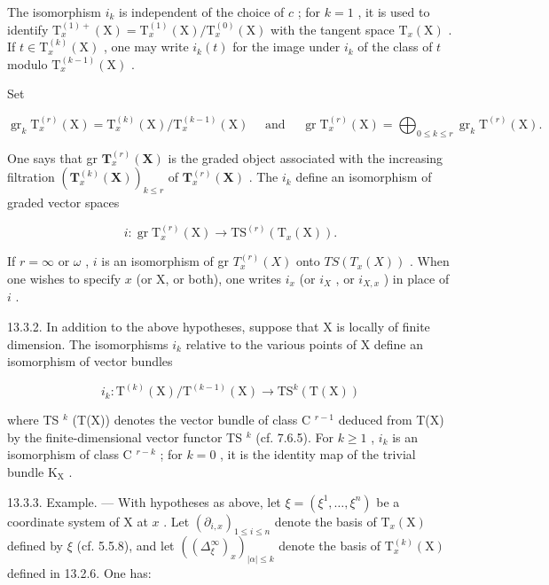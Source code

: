 The isomorphism \(i_k\) is independent of the choice of \(c\) ; for \(k = 1\) , it is used to identify \(\mathrm{T}_x^{(1)+}(\mathrm{X}) = \mathrm{T}_x^{(1)}(\mathrm{X}) / \mathrm{T}_x^{(0)}(\mathrm{X})\) with the tangent space \(\mathrm{T}_x(\mathrm{X})\) . If \(t \in \mathrm{T}_x^{(k)}(\mathrm{X})\) , one may write \(i_k(t)\) for the image under \(i_k\) of the class of \(t\) modulo \(\mathrm{T}_x^{(k-1)}(\mathrm{X})\) .

Set

\[
\operatorname{gr} _ {k} \mathrm{T} _ {x} ^ {(r)} (\mathrm{X}) = \mathrm{T} _ {x} ^ {(k)} (\mathrm{X}) / \mathrm{T} _ {x} ^ {(k - 1)} (\mathrm{X}) \quad \text { and } \quad \operatorname{gr} \mathrm{T} _ {x} ^ {(r)} (\mathrm{X}) = \bigoplus_ {0 \leqslant k \leqslant r} \operatorname{gr} _ {k} \mathrm{T} ^ {(r)} (\mathrm{X}).
\]

One says that gr \(\mathbf{T}_{x}^{(r)}(\mathbf{X})\) is the graded object associated with the increasing filtration \((\mathbf{T}_{x}^{(k)}(\mathbf{X}))_{k\leq r}\) of \(\mathbf{T}_{x}^{(r)}(\mathbf{X})\) . The \(i_k\) define an isomorphism of graded vector spaces

\[
i \colon \operatorname{gr} \mathrm{T} _ {x} ^ {(r)} (\mathrm{X}) \rightarrow \mathrm{TS} ^ {(r)} (\mathrm{T} _ {x} (\mathrm{X})).
\]

If \(r = \infty\) or \(\omega\) , \(i\) is an isomorphism of gr \(T_x^{(r)}(X)\) onto \(TS(T_x(X))\) . When one wishes to specify \(x\) (or X, or both), one writes \(i_x\) (or \(i_X\) , or \(i_{X,x}\) ) in place of \(i\) .

13.3.2. In addition to the above hypotheses, suppose that X is locally of finite dimension. The isomorphisms \(i_{k}\) relative to the various points of X define an isomorphism of vector bundles

\[
i _ {k} \colon \mathrm{T} ^ {(k)} (\mathrm{X}) / \mathrm{T} ^ {(k - 1)} (\mathrm{X}) \rightarrow \mathrm{TS} ^ {k} (\mathrm{T} (\mathrm{X}))
\]

where TS \(^{k}\) (T(X)) denotes the vector bundle of class C \(^{r-1}\) deduced from T(X) by the finite-dimensional vector functor TS \(^{k}\) (cf. 7.6.5). For \(k \geqslant 1\) , \(i_{k}\) is an isomorphism of class C \(^{r-k}\) ; for \(k = 0\) , it is the identity map of the trivial bundle \(\mathrm{K}_{\mathrm{X}}\) .

13.3.3. Example. --- With hypotheses as above, let \(\xi = (\xi^{1}, \ldots, \xi^{n})\) be a coordinate system of X at \(x\) . Let \((\partial_{i,x})_{1 \leqslant i \leqslant n}\) denote the basis of \(\mathrm{T}_{x}(\mathrm{X})\) defined by \(\xi\) (cf. 5.5.8), and let \(((\Delta_{\xi}^{\infty})_{x})_{|\alpha| \leqslant k}\) denote the basis of \(\mathrm{T}_{x}^{(k)}(\mathrm{X})\) defined in 13.2.6. One has:

